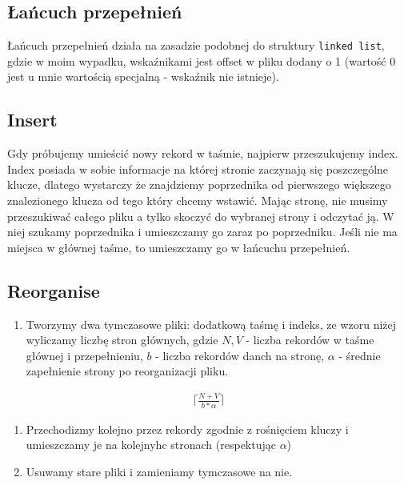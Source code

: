 \documentclass[
]{article}
\providecommand{\tightlist}{%
  \setlength{\itemsep}{0pt}\setlength{\parskip}{0pt}}
\begin{document}
\subsection{Łańcuch
przepełnień}\label{ux142aux144cuch-przepeux142nieux144}

Łańcuch przepełnień działa na zasadzie podobnej do struktury
\texttt{linked\ list}, gdzie w moim wypadku, wskaźnikami jest offset w
pliku dodany o 1 (wartość 0 jest u mnie wartością specjalną - wskaźnik
nie istnieje).

\subsection{Insert}\label{insert}

Gdy próbujemy umieścić nowy rekord w taśmie, najpierw przeszukujemy
index. Index posiada w sobie informacje na której stronie zaczynają się
poszczególne klucze, dlatego wystarczy że znajdziemy poprzednika od
pierwszego większego znalezionego klucza od tego który chcemy wstawić.
Mając stronę, nie musimy przeszukiwać całego pliku a tylko skoczyć do
wybranej strony i odczytać ją. W niej szukamy poprzednika i umieszczamy
go zaraz po poprzedniku. Jeśli nie ma miejsca w głównej taśme, to
umieszczamy go w łańcuchu przepełnień.

\subsection{Reorganise}\label{reorganise}

\begin{enumerate}
\def\labelenumi{\arabic{enumi}.}
\tightlist
\item
  Tworzymy dwa tymczasowe pliki: dodatkową taśmę i indeks, ze wzoru
  niżej wyliczamy liczbę stron głównych, gdzie \(N,V\) - liczba rekordów
  w taśme głównej i przepełnieniu, \(b\) - liczba rekordów danch na
  stronę, \(\alpha\) - średnie zapełnienie strony po reorganizacji
  pliku.
\end{enumerate}

\begin{align}
\lceil \frac{N+V}{b* \alpha }\rceil
\end{align}

\begin{enumerate}
\def\labelenumi{\arabic{enumi}.}
\setcounter{enumi}{1}
\item
  Przechodizmy kolejno przez rekordy zgodnie z rośnięciem kluczy i
  umieszczamy je na kolejnyhc stronach (respektując \(\alpha\))
\item
  Usuwamy stare pliki i zamieniamy tymczasowe na nie.
\end{enumerate}
\end{document}
